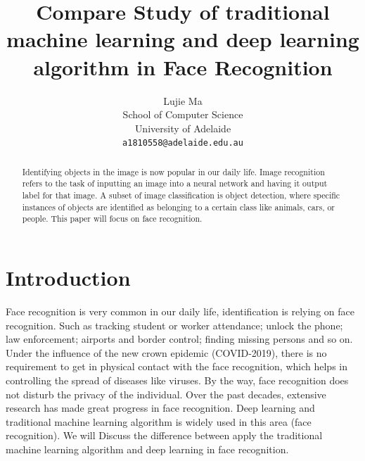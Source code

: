 \documentclass[10pt,twocolumn,letterpaper]{article}
\begin{document}
\title{Compare Study of traditional machine learning and deep learning algorithm in Face Recognition}

\author{Lujie Ma\\
School of Computer Science\\
University of Adelaide\\
{\tt\small a1810558@adelaide.edu.au}
}
\maketitle

\begin{abstract}

 Identifying objects in the image is now popular in our daily life. Image recognition refers to the task of inputting an image into a neural network and 
 having it output label for that image. A subset of image classification is object detection, where specific instances of objects are identified as belonging 
 to a certain class like animals, cars, or people. This paper will focus on face recognition.
\end{abstract}


\section{Introduction}
\label{sec:intro}

Face recognition is very common in our daily life, identification is relying on face recognition.
Such as tracking student or worker attendance; unlock the phone; law enforcement; airports and border control; finding missing persons and so on.
Under the influence of the new crown epidemic (COVID-2019),
there is no requirement to get in physical contact with the face recognition, which helps in controlling the spread of diseases like viruses.
By the way, face recognition does not disturb the privacy of the individual.
Over the past decades, extensive research has made great progress in face recognition. 
Deep learning and traditional machine learning algorithm is widely used in this area (face recognition). 
We will Discuss the difference between apply the traditional machine learning algorithm and deep learning in face recognition.
\end{document}
